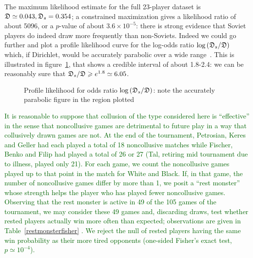 \documentclass[review]{elsarticle}
\begin{document}
The maximum likelihood estimate for the full 23-player dataset is
$\mathfrak{D}\simeq 0.043, \mathfrak{D}_s=0.354$; a constrained maximization gives a
likelihood ratio of about 5096, or a $p$-value of about $3.6\times
10^{-5}$: there is strong evidence that Soviet players do indeed draw
more frequently than non-Soviets.  Indeed we could go further and plot
a profile likelihood curve for the log-odds ratio
$\log\left(\mathfrak{D}_s/\mathfrak{D}\right)$ which, if Dirichlet, would be
accurately parabolic over a wide range~\cite[page 343]{ohagan2004}.
This is illustrated in figure~\ref{proflike}, that shows a credible
interval of about 1.8-2.4: we can be reasonably sure that
$\mathfrak{D}_s/\mathfrak{D}\geqslant e^{1.8}\simeq 6.05$.


\begin{figure}[htbp]
\begin{center}
\caption{Profile likelihood \label{proflike} for odds ratio
  $\log\left(\mathfrak{D}_s/\mathfrak{D}\right)$: note the accurately parabolic figure in
  the region plotted}
  \end{center}
\end{figure}


\textcolor{DarkGreen}{It is reasonable to suppose that collusion of
  the type considered here is ``effective'' in the sense that
  noncollusive games are detrimental to future play in a way that
  collusively drawn games are not.  At the end of the tournament,
  Petrosian, Keres and Geller had each played a total of 18
  noncollusive matches while Fischer, Benko and Filip had played a
  total of 26 or 27 (Tal, retiring mid tournament due to illness,
  played only 21).  For each game, we count the noncollusive games
  played up to that point in the match for White and Black.  If, in
  that game, the number of noncollusive games differ by more than 1,
  we posit a ``rest monster'' whose strength helps the player who has
  played fewer noncollusive games.  Observing that the rest monster is
  active in 49 of the 105 games of the tournament, we may consider
  these 49 games and, discarding draws, test whether rested players
  actually win more often than expected; observations are given in
  Table~\ref{restmonsterfisher} .  We reject the null of rested
  players having the same win probability as their more tired
  opponents (one-sided Fisher's exact test, $p\simeq 10^{-4}$).}

\begin{table}
\textcolor{DarkGreen}{
  \caption{Results for won games in Cura\c{c}ao 1962  between
      rested and unrested players    \label{restmonsterfisher}}
  \centering
  }
\end{table}
\end{document}
